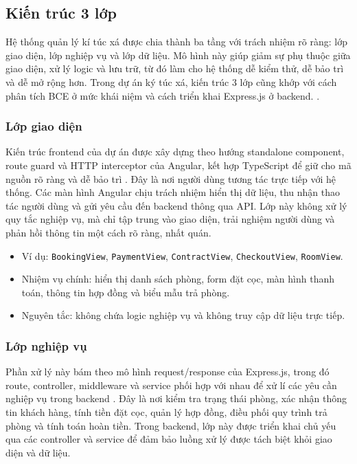 \subsection{Kiến trúc 3 lớp}
\label{sec:three-layer-architecture}

Hệ thống quản lý kí túc xá được chia thành ba tầng với trách nhiệm rõ ràng: lớp
giao diện, lớp nghiệp vụ và lớp dữ liệu. Mô hình này giúp giảm sự phụ thuộc giữa
giao diện, xử lý logic và lưu trữ, từ đó làm cho hệ thống dễ kiểm thử, dễ bảo trì
và dễ mở rộng hơn. Trong dự án ký túc xá, kiến trúc 3 lớp cũng khớp với cách
phân tích BCE ở mức khái niệm và cách triển khai Express.js ở backend. \cite{pham_nguyen_cuong_phan_tich_thiet_ke_he_thong_thong_tin_theo_huong_doi_tuong}.

\subsubsection{Lớp giao diện}
Kiến trúc frontend của dự án được xây dựng theo hướng standalone component, route
guard và HTTP interceptor của Angular, kết hợp TypeScript để giữ cho mã nguồn rõ
ràng và dễ bảo trì \cite{angular_docs,typescript_docs,tailwind_docs}.
Đây là nơi người dùng tương tác trực tiếp với hệ thống. Các màn hình
Angular chịu trách nhiệm hiển thị dữ liệu, thu nhận thao tác người dùng và gửi
yêu cầu đến backend thông qua API. Lớp này không xử lý quy tắc nghiệp vụ, mà chỉ
tập trung vào giao diện, trải nghiệm người dùng và phản hồi thông tin một
cách rõ ràng, nhất quán.

\begin{itemize}
    \item Ví dụ: \texttt{BookingView}, \texttt{PaymentView}, \texttt{ContractView}, \texttt{CheckoutView}, \texttt{RoomView}.
    \item Nhiệm vụ chính: hiển thị danh sách phòng, form đặt cọc, màn hình thanh toán, thông tin hợp đồng và biểu mẫu trả phòng.
    \item Nguyên tắc: không chứa logic nghiệp vụ và không truy cập dữ liệu trực tiếp.
\end{itemize}

\subsubsection{Lớp nghiệp vụ}
Phần xử lý này bám theo mô hình request/response của Express.js, trong đó route,
controller, middleware và service phối hợp với nhau để xử lí các yêu cần nghiệp vụ
trong backend \cite{express_docs}. Đây là nơi kiểm tra trạng
thái phòng, xác nhận thông tin khách hàng, tính tiền đặt cọc, quản lý hợp đồng,
điều phối quy trình trả phòng và tính toán hoàn tiền. Trong backend, lớp này được
triển khai chủ yếu qua các controller và service để đảm bảo luồng xử lý được tách
biệt khỏi giao diện và dữ liệu.

